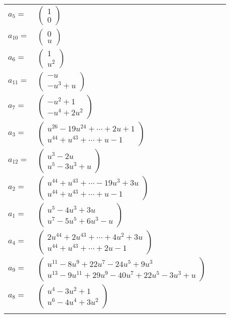 \documentclass[1p]{elsarticle_modified}
\theoremstyle{definition}
\begin{document}
\begin{tabular}{m{7pt} m{180pt} m{7pt} m{180pt} }
\flushright $a_{5}=$&$\begin{pmatrix}1\\0\end{pmatrix}$ \\
\flushright $a_{10}=$&$\begin{pmatrix}0\\u\end{pmatrix}$ \\
\flushright $a_{6}=$&$\begin{pmatrix}1\\u^2\end{pmatrix}$ \\
\flushright $a_{11}=$&$\begin{pmatrix}- u\\- u^3+u\end{pmatrix}$ \\
\flushright $a_{7}=$&$\begin{pmatrix}- u^2+1\\- u^4+2 u^2\end{pmatrix}$ \\
\flushright $a_{3}=$&$\begin{pmatrix}u^{26}-19 u^{24}+\cdots+2 u+1\\u^{44}+u^{43}+\cdots+u-1\end{pmatrix}$ \\
\flushright $a_{12}=$&$\begin{pmatrix}u^3-2 u\\u^5-3 u^3+u\end{pmatrix}$ \\
\flushright $a_{2}=$&$\begin{pmatrix}u^{44}+u^{43}+\cdots-19 u^3+3 u\\u^{44}+u^{43}+\cdots+u-1\end{pmatrix}$ \\
\flushright $a_{1}=$&$\begin{pmatrix}u^5-4 u^3+3 u\\u^7-5 u^5+6 u^3- u\end{pmatrix}$ \\
\flushright $a_{4}=$&$\begin{pmatrix}2 u^{44}+2 u^{43}+\cdots+4 u^2+3 u\\u^{44}+u^{43}+\cdots+2 u-1\end{pmatrix}$ \\
\flushright $a_{9}=$&$\begin{pmatrix}u^{11}-8 u^9+22 u^7-24 u^5+9 u^3\\u^{13}-9 u^{11}+29 u^9-40 u^7+22 u^5-3 u^3+u\end{pmatrix}$ \\
\flushright $a_{8}=$&$\begin{pmatrix}u^4-3 u^2+1\\u^6-4 u^4+3 u^2\end{pmatrix}$\\&\end{tabular}
\end{document}
